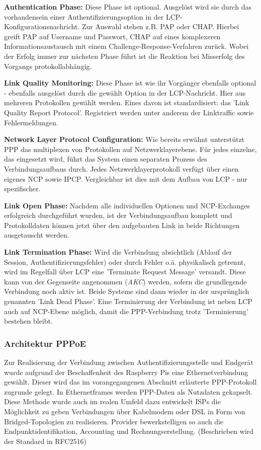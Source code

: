 \textbf{Authentication Phase:}
Diese Phase ist optional. Ausgelöst wird sie durch das vorhandensein einer
Authentifizierungsoption in der LCP-Konfigurationsnachricht.
Zur Auswahl stehen z.B. \ac{PAP} oder \ac{CHAP}.
Hierbei greift PAP auf Username und Passwort, CHAP auf eines komplexeren Informationsaustausch
mit einem Challenge-Response-Verfahren zurück. Wobei der Erfolg immer zur nächsten
Phase führt ist die Reaktion bei Misserfolg des Vorgangs protokollabhängig.

\textbf{Link Quality Monitoring:}
Diese Phase ist wie ihr Vorgänger ebenfalls optional - ebenfalls ausgelöst durch
die gewählt Option in der LCP-Nachricht.
Hier aus mehreren Protokollen gewählt werden. Eines davon ist standardisiert:
das 'Link Quality Report Protocol'. Registriert werden unter anderem der Linktraffic
sowie Fehlermeldungen.

\textbf{Network Layer Protocol Configuration:}
Wie bereits erwähnt unterstützt PPP  das multiplexen von Protokollen auf
Netzwerklayerebene. Für jedes einzelne, das eingesetzt wird,
führt das System einen separaten Prozess des Verbindungsaufbaus durch.
Jedes Netzwerklayerprotokoll verfügt über einen eigenes \ac{NCP} sowie \ac{IPCP}.
Vergleichbar ist dies mit dem Aufbau von \ac{LCP} - nur spezifischer.

\textbf{Link Open Phase:}
Nachdem alle individuellen Optionen und NCP-Exchanges erfolgreich durchgeführt wurden,
ist der Verbindungsaufbau komplett und Protokolldaten können jetzt über den aufgebauten
Link in beide Richtungen ausgetauscht werden.

\textbf{Link Termination Phase:}
Wird die Verbindung absichtlich (Ablauf der Session, Authentifizierungsfehler)
oder durch Fehler o.ä. physikalisch getrennt, wird im Regelfall über \ac{LCP}
eine 'Terminate Request Message' versandt. Diese kann von der Gegenseite
angenommen (\textit{AKC}) werden, sofern die grundlegende Verbindung noch aktiv ist.
Beide Systeme sind dann wieder in der ursprünglich genannten 'Link Dead Phase'.
Eine Terminierung der Verbindung ist neben \ac{LCP} auch auf \ac{NCP}-Ebene möglich,
damit die PPP-Verbindung trotz 'Terminierung' bestehen bleibt.


\subsubsection{Architektur PPPoE}\label{subsubsection:architecture_pppoe}
Zur Realisierung der Verbindung zwischen Authentifizierungsstelle und
Endgerät wurde aufgrund der Beschaffenheit des Raspberry Pis eine
Ethernetverbindung gewählt. Dieser wird das im vorangegangenen
Abschnitt erläuterte \ac{PPP}-Protokoll zugrunde gelegt.
In Ethernetframes werden PPP-Daten als Nutzdaten gekapselt.
Diese Methode wurde auch im realen Umfeld dazu entwickelt \ac{ISP}s die
Möglichkeit zu geben Verbindungen über Kabelmodem oder DSL in Form
von Bridged-Topologien zu realisieren. Provider bewerkstelligen
so auch die Endpunktidentifikation, Accounting und Rechnungserstellung.
(Beschrieben wird der Standard in RFC2516)

